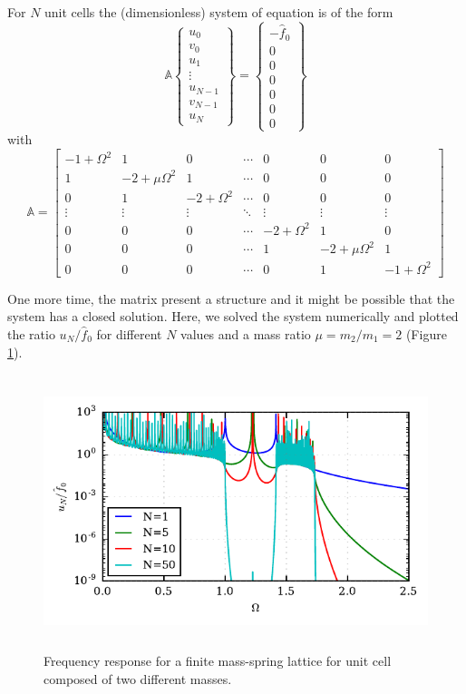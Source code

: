 \documentclass[12pt]{article}
\begin{document}
For $N$ unit cells the (dimensionless) system of equation is of the form
\begin{equation}
\mathbb{A}
\begin{Bmatrix}
u_0 \\ 
v_0 \\ 
u_1 \\ 
\vdots \\ 
u_{N-1} \\ 
v_{N-1} \\ 
u_N
\end{Bmatrix} = 
\begin{Bmatrix}
-\hat{f}_0 \\ 
0 \\ 
0 \\ 
0 \\ 
0 \\ 
0 \\ 
0
\end{Bmatrix}
\end{equation}
with
\[\mathbb{A} = \begin{bmatrix}
-1 + \Omega^2 & 1 & 0 & \cdots & 0 & 0 & 0 \\ 
1 & -2 +\mu \Omega^2 & 1 & \cdots & 0 & 0 & 0 \\ 
0 & 1 & -2 + \Omega^2 & \cdots & 0 & 0 & 0 \\ 
\vdots & \vdots & \vdots & \ddots & \vdots & \vdots & \vdots \\ 
0 & 0 & 0 & \cdots & -2 + \Omega^2 & 1 & 0 \\ 
0 & 0 & 0 & \cdots & 1 & -2 +\mu \Omega^2 & 1 \\ 
0 & 0 & 0 & \cdots & 0 & 1 & -1 + \Omega^2
\end{bmatrix} \]


One more time, the matrix present a structure and it might be  possible that the system has a closed solution. Here, we solved the system numerically and plotted the ratio $u_N/\hat{f}_0$ for different $N$ values and a mass ratio $\mu=m_2/m_1=2$ (Figure \ref{fig:diatomic-finite-disp}).
\begin{figure}[H]
\centering
\includegraphics[height=8cm]{img/diatomic_finite.pdf} 
\caption{Frequency response for a finite mass-spring lattice for unit cell composed of two different masses.}
\label{fig:diatomic-finite-disp}
\end{figure}
\end{document}
